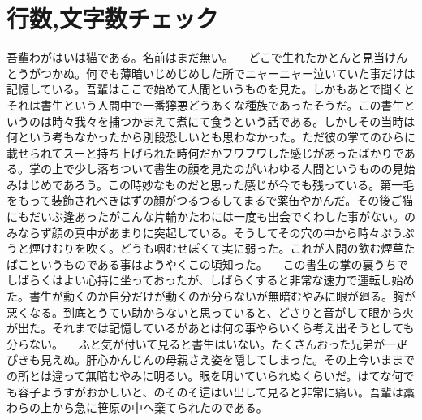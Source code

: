 \documentclass[12pt,a4paper,onecolumn]{jsreport}
\begin{document}
\section{行数,文字数チェック}
\clearpage
吾輩わがはいは猫である。名前はまだ無い。
　どこで生れたかとんと見当けんとうがつかぬ。何でも薄暗いじめじめした所でニャーニャー泣いていた事だけは記憶している。吾輩はここで始めて人間というものを見た。しかもあとで聞くとそれは書生という人間中で一番獰悪どうあくな種族であったそうだ。この書生というのは時々我々を捕つかまえて煮にて食うという話である。しかしその当時は何という考もなかったから別段恐しいとも思わなかった。ただ彼の掌てのひらに載せられてスーと持ち上げられた時何だかフワフワした感じがあったばかりである。掌の上で少し落ちついて書生の顔を見たのがいわゆる人間というものの見始みはじめであろう。この時妙なものだと思った感じが今でも残っている。第一毛をもって装飾されべきはずの顔がつるつるしてまるで薬缶やかんだ。その後ご猫にもだいぶ逢あったがこんな片輪かたわには一度も出会でくわした事がない。のみならず顔の真中があまりに突起している。そうしてその穴の中から時々ぷうぷうと煙けむりを吹く。どうも咽むせぽくて実に弱った。これが人間の飲む煙草たばこというものである事はようやくこの頃知った。
　この書生の掌の裏うちでしばらくはよい心持に坐っておったが、しばらくすると非常な速力で運転し始めた。書生が動くのか自分だけが動くのか分らないが無暗むやみに眼が廻る。胸が悪くなる。到底とうてい助からないと思っていると、どさりと音がして眼から火が出た。それまでは記憶しているがあとは何の事やらいくら考え出そうとしても分らない。
　ふと気が付いて見ると書生はいない。たくさんおった兄弟が一疋ぴきも見えぬ。肝心かんじんの母親さえ姿を隠してしまった。その上今いままでの所とは違って無暗むやみに明るい。眼を明いていられぬくらいだ。はてな何でも容子ようすがおかしいと、のそのそ這はい出して見ると非常に痛い。吾輩は藁わらの上から急に笹原の中へ棄てられたのである。
\end{document}
